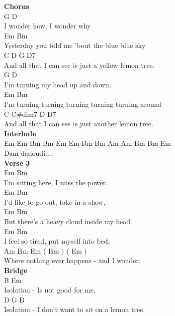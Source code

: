 \documentclass[a4paper]{article}
\begin{document}
{{        }
        \textbf{Chorus}
        ~\\
        {
            \cutive
            \obeyspaces
   G             D
\\
I wonder how, I wonder why
\\
Em                              Bm
\\
Yesterday you told me 'bout the blue blue sky
\\
    C              D                    G           D7
\\
And all that I can see is just a yellow lemon tree.
\\
    G               D
\\
I'm turning my head up and down,
\\
Em                                  Bm
\\
I'm turning turning turning turning turning around
\\
    C              C\#dim7              D          D7
\\
And all that I can see is just another lemon tree.
\\

        }
        \textbf{Interlude}
        ~\\
        {
            \cutive
            \obeyspaces
 Em  Em  Bm  Bm  Em  Em  Bm  Bm  Am  Am  Bm  Bm  Em
\\
Dam     dadoudi....
\\

        }
        \textbf{Verse 3}
        ~\\
        {
            \cutive
            \obeyspaces
      Em             Bm
\\
I'm sitting here, I miss the power.
\\
     Em              Bm
\\
I'd like to go out, take in a show,
\\
    Em                    Bm
\\
But there's a heavy cloud inside my head.
\\
    Em                 Bm
\\
I feel so tired, put myself into bed,
\\
    Am             Bm           Em       ( Bm ) ( Em )
\\
Where nothing ever happens - and I wonder.
\\

        }
        \textbf{Bridge}
        ~\\
        {
            \cutive
            \obeyspaces
B           Em
\\
Isolation - Is not good for me,
\\
D           G               B
\\
Isolation - I don't want to sit on a lemon tree.
\\

}}
\end{document}
